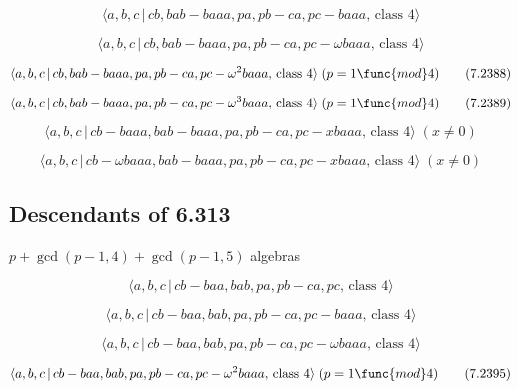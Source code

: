 \documentclass[10pt]{article}
\begin{document}
\begin{equation}
\langle a,b,c\,|\,cb,bab-baaa,pa,pb-ca,pc-baaa,\,\text{class }4\rangle 
\tag{7.2386}
\end{equation}

\begin{equation}
\langle a,b,c\,|\,cb,bab-baaa,pa,pb-ca,pc-\omega baaa,\,\text{class }4\rangle
\tag{7.2387}
\end{equation}

\begin{equation}
\langle a,b,c\,|\,cb,bab-baaa,pa,pb-ca,pc-\omega ^{2}baaa,\,\text{class }%
4\rangle \;(p=1\func{mod}4)  \tag{7.2388}
\end{equation}

\begin{equation}
\langle a,b,c\,|\,cb,bab-baaa,pa,pb-ca,pc-\omega ^{3}baaa,\,\text{class }%
4\rangle \;(p=1\func{mod}4)  \tag{7.2389}
\end{equation}

\begin{equation}
\langle a,b,c\,|\,cb-baaa,bab-baaa,pa,pb-ca,pc-xbaaa,\,\text{class }4\rangle
\;(x \neq 0)  \tag{7.2390}
\end{equation}

\begin{equation}
\langle a,b,c\,|\,cb-\omega baaa,bab-baaa,pa,pb-ca,pc-xbaaa,\,\text{class }%
4\rangle \;(x\neq 0)  \tag{7.2391}
\end{equation}

\subsection{Descendants of 6.313}

$p+\gcd (p-1,4)+\gcd (p-1,5)$ algebras

\begin{equation}
\langle a,b,c\,|\,cb-baa,bab,pa,pb-ca,pc,\,\text{class }4\rangle 
\tag{7.2392}
\end{equation}

\begin{equation}
\langle a,b,c\,|\,cb-baa,bab,pa,pb-ca,pc-baaa,\,\text{class }4\rangle 
\tag{7.2393}
\end{equation}

\begin{equation}
\langle a,b,c\,|\,cb-baa,bab,pa,pb-ca,pc-\omega baaa,\,\text{class }4\rangle
\tag{7.2394}
\end{equation}

\begin{equation}
\langle a,b,c\,|\,cb-baa,bab,pa,pb-ca,pc-\omega ^{2}baaa,\,\text{class }%
4\rangle \;(p=1\func{mod}4)  \tag{7.2395}
\end{equation}
\end{document}
